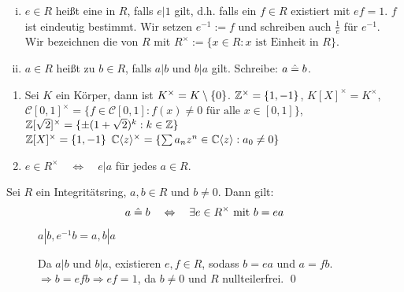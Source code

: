 \begin{defn} \label{def_1.2}
	\begin{enumerate}[(i)]
		\item $e \in R$ heißt eine  in $R$, falls $e | 1$ gilt, d.h. falls ein $f \in R$ existiert mit $ef = 1$. $f$ ist eindeutig bestimmt. Wir setzen $e^{-1} := f$ und schreiben auch $\frac{1}{e}$ für $e^{-1}$. \\
		Wir bezeichnen die  von $R$ mit $R^\times := \{x \in R : x \text{ ist Einheit in } R\}$.
		\item $a \in R$ heißt  zu $b \in R$, falls $a | b$ und $b | a$ gilt. Schreibe: $a \assoz b$.
	\end{enumerate}
\end{defn}

\newpage
\begin{bsp}
	\begin{enumerate}[1)]
		\item Sei $K$ ein Körper, dann ist $K^\times = K \setminus \setnull$. \qquad $\ZZ^\times = \{1,-1\}$, \qquad $K[X]^\times = K^\times$, \\
		$\mathcal{C}[0,1]^\times = \{f \in \mathcal{C}[0,1] : f(x) \neq 0 \text{ für alle } x \in [0,1]\}$, \qquad  $\ZZ[\sqrt{2}]^\times = \{\pm (1+\sqrt{2})^k : k \in \ZZ \}$ \\
		$\ZZ[X]^\times = \{1, -1\}$ \qquad $\CC \sprod{z}^\times = \penbrace*{ \sum a_n z^n \in \CC \sprod{z} : a_0 \neq 0}$
		\item $e \in R^\times \quad \Leftrightarrow \quad e | a$ für jedes $a \in R$.
	\end{enumerate}
\end{bsp}

\begin{falko} \label{F1.2}
	Sei $R$ ein Integritätsring, $a, b \in R$ und $b \neq 0$. Dann gilt:
	\[ a \assoz b \quad \Leftrightarrow \quad \exists e \in R^\times \text{ mit } b = ea \]
\end{falko}

	\begin{description}
		\item[\bewrueck] $a | b, e^{-1}b = a, b | a$
		\item[\bewhin] Da $a | b$ und $b | a$, existieren $e, f \in R$, sodass $b = ea$ und $a = fb$. $\Rightarrow b = efb \Rightarrow ef = 1$, da $b \neq 0$ und $R$ nullteilerfrei. \qed
	\end{description}

